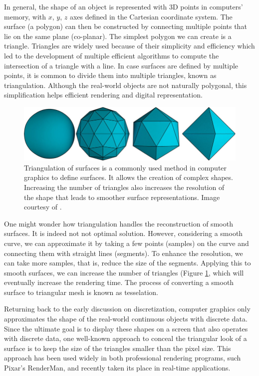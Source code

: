 In general, the shape of an object is represented with 3D points in computers' memory, with $x$, $y$, $z$ axes defined in the Cartesian coordinate system. The surface (a polygon) can then be constructed by connecting multiple points that lie on the same plane (co-planar). The simplest polygon we can create is a triangle. Triangles are widely used because of their simplicity and efficiency which led to the development of multiple efficient algorithms to compute the intersection of a triangle with a line. In case surfaces are defined by multiple points, it is common to  divide them into multiple triangles, known as triangulation. Although the real-world objects are not naturally polygonal, this simplification helps efficient rendering and digital representation.

\begin{figure}
  \centering
   \includegraphics[width=0.7\linewidth]{Images/Triangulation-of-surfaces-Any-curved-surface-in-this-case-a-sphere-can-be-approximated.png}
   \caption{Triangulation of surfaces is a commonly used method in computer graphics to define surfaces. It allows the creation of complex shapes. Increasing the number of triangles also increases the resolution of the shape that leads to smoother surface representations. Image courtesy of \citeauthor{triangulation} \cite{triangulation}.}
   \label{fig:triangulation}
\end{figure}

One might wonder how triangulation handles the reconstruction of smooth surfaces. It is indeed not not optimal solution. However, considering a smooth curve, we can approximate it by taking a few points (samples) on the curve and connecting them with straight lines (segments). To enhance the resolution, we can take more samples, that is, reduce the size of the segments. Applying this to smooth surfaces, we can increase the number of triangles (Figure \ref{fig:triangulation}, which will eventually increase the rendering time. The process of converting a smooth surface to triangular mesh is known as tesselation.


Returning back to the early discussion on discretization, computer graphics only approximates the shape of the real-world continuous objects with discrete data. Since the ultimate goal is to display these shapes on a screen that also operates with discrete data, one well-known approach to conceal the triangular look of a surface is to keep the size of the triangles smaller than the pixel size. This approach has been used widely in both professional rendering programs, such Pixar's RenderMan, and recently taken its place in real-time applications.

